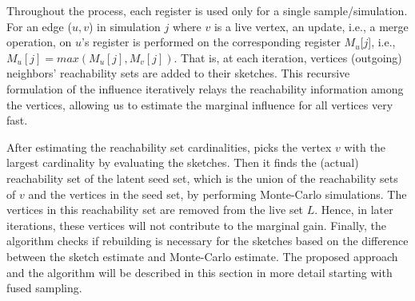 \documentclass[review]{elsarticle}
\newcommand\acro{{\sc{HyperFuseR\xspace}\xspace}\xspace}
\newcommand\kktodo[1]{\textcolor{red}{#1}}
\begin{document}
Throughout the process, each register is used only for a single sample/simulation. 
For an edge ($u, v$) in simulation $j$ where $v$ is a live vertex, an update, i.e., a merge operation, on $u$'s register is performed on the corresponding register $M_u$[$j$], i.e., $M_u[j] = max(M_u[j],M_v[j])$.
That is, at each iteration, vertices (outgoing) neighbors' reachability sets are added to their sketches.
This recursive formulation of the influence iteratively relays the reachability information among the vertices, allowing us to estimate the marginal influence for all vertices very fast.

After estimating the reachability set cardinalities, \acro picks the vertex $v$ with the largest cardinality by evaluating the sketches. Then it finds the (actual) reachability set of the latent seed set, which is the union of the reachability sets of $v$ and the vertices in the seed set, by performing Monte-Carlo simulations. The vertices in this reachability set are removed from the live set $L$. %
Hence, in later iterations, these vertices will not contribute to the marginal gain. Finally, the algorithm checks if rebuilding is necessary for the sketches based on the difference between the sketch estimate and Monte-Carlo estimate. The proposed approach and the algorithm will be described in this section in more detail starting with fused sampling.%
\end{document}
